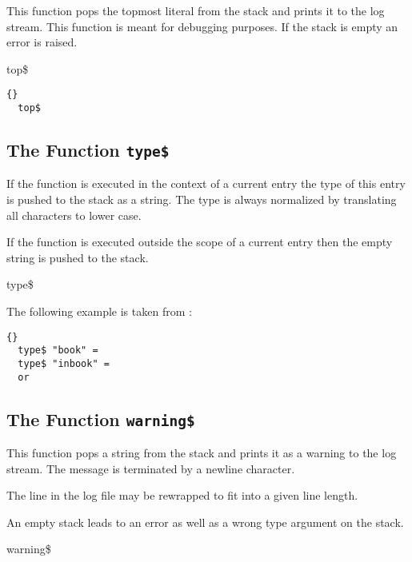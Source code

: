 This function pops the topmost literal from the stack and prints it
to the log stream. This function is meant for debugging purposes.
If the stack is empty an error is raised.

\begin{BstFunction}{top\$}
\end{BstFunction}

\begin{lstlisting}{}
  top$
\end{lstlisting}


\subsection{The Function \texttt{type\$}}%

If the function is executed in the context of a current entry the type
of this entry is pushed to the stack as a string. The type is always
normalized by translating all characters to lower case.

If the function is executed outside the scope of a current entry then
the empty string is pushed to the stack.

\begin{BstFunction}{type\$}
\end{BstFunction}

The following example is taken from :

\begin{lstlisting}{}
  type$ "book" =
  type$ "inbook" =
  or
\end{lstlisting}\fctIndex{=}


\subsection{The Function \texttt{warning\$}}%

This function pops a string from the stack and prints it as a
warning to the log stream. The message is terminated by a newline character.

The line in the log file may be rewrapped to fit into a given line
length.

An empty stack leads to an error as well as a wrong type argument on
the stack.

\begin{BstFunction}{warning\$}
\end{BstFunction}


